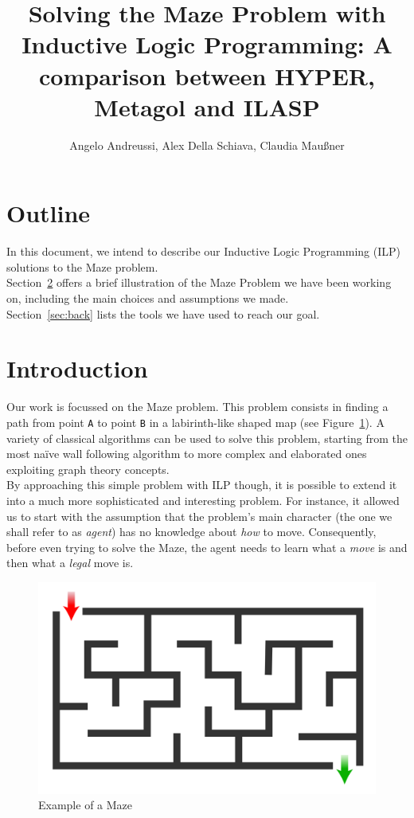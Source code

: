 \documentclass[12pt]{article}
\title{Solving the Maze Problem with Inductive Logic Programming: A comparison between HYPER, Metagol and ILASP}
\author{Angelo Andreussi, Alex Della Schiava, Claudia Mau\ss ner}
\begin{document}
\maketitle

\section{Outline}
In this document, we intend to describe our Inductive Logic Programming (ILP) solutions to the Maze problem.\\
Section~\ref{sec:intro} offers a brief illustration of the Maze Problem we have been working on,
including the main choices and assumptions we made.\\
Section~\ref{sec:back} lists the tools we have used to reach our goal.
\section{Introduction}\label{sec:intro}
Our work is focussed on the Maze problem. This problem consists in finding a path from point \texttt{A}
to point \texttt{B} in a labirinth-like shaped map (see Figure~\ref{fig:fig1}). A variety of classical algorithms
can be used to solve this problem, starting from the most naïve wall following algorithm to more complex and elaborated
ones exploiting graph theory concepts.\\
By approaching this simple problem with ILP though, it is possible to extend it into a much more sophisticated and interesting
problem. For instance, it allowed us to start with the assumption that the problem's main character (the
one we shall refer to as \emph{agent}) has no knowledge about \emph{how} to move. Consequently, before even trying
to solve the Maze, the agent needs to learn what a \emph{move} is and then what a \emph{legal} move is.


\begin{figure}[b]
  \centering
  \includegraphics[scale=0.1]{img/Maze_simple.svg.png}
  \caption{Example of a Maze}\label{fig:fig1}
\end{figure}
\end{document}
